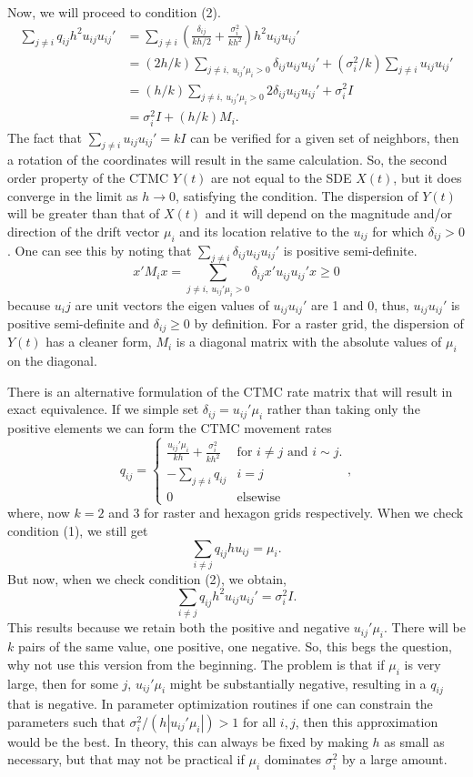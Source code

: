\documentclass[12pt]{article}
\begin{document}
Now, we will proceed to condition (2). $$
\begin{aligned}
\sum_{j\ne i} q_{ij} h^2 u_{ij}u_{ij}' &= \sum_{j\ne i} \left(\frac{\delta_{ij}}{kh/2} + \frac{\sigma^2_i}{kh^2}\right) h^2 u_{ij}u_{ij}' \\
&=  (2h/k)\sum_{j\ne i,\ u_{ij}'\mu_i >0} \delta_{ij}u_{ij}u_{ij}' + (\sigma^2_i/k) \sum_{j\ne i} u_{ij}u_{ij}'\\
&= (h/k)\sum_{j\ne i,\ u_{ij}'\mu_i >0} 2\delta_{ij}u_{ij}u_{ij}' + \sigma^2_i I \\
&=  \sigma^2_i I + (h/k)M_i.
\end{aligned}
$$ The fact that $\sum_{j\ne i} u_{ij}u_{ij}' = kI$ can be verified for a given set of neighbors, then a rotation of the coordinates will result in the same calculation. So, the second order property of the CTMC $Y(t)$ are not equal to the SDE $X(t)$, but it does converge in the limit as $h\to 0$, satisfying the condition. The dispersion of $Y(t)$ will be greater than that of $X(t)$ and it will depend on the magnitude and/or direction of the drift vector $\mu_i$ and its location relative to the $u_{ij}$ for which $\delta_{ij} >0$. One can see this by noting that $\sum_{j\ne i} \delta_{ij}u_{ij}u_{ij}'$ is positive semi-definite. $$
x'M_ix =  \sum_{j\ne i,\ u_{ij}'\mu_i >0} \delta_{ij} x'u_{ij}u_{ij}'x \ge 0
$$ because $u_ij$ are unit vectors the eigen values of $u_{ij}u_{ij}'$ are 1 and 0, thus, $u_{ij}u_{ij}'$ is positive semi-definite and $\delta_{ij} \ge 0$ by definition. For a raster grid, the dispersion of $Y(t)$ has a cleaner form, $M_i$ is a diagonal matrix with the absolute values of $\mu_i$ on the diagonal.

There is an alternative formulation of the CTMC rate matrix that will result in exact equivalence. If we simple set $\delta_{ij} = u_{ij}'\mu_i$ rather than taking only the positive elements we can form the CTMC movement rates $$
q_{ij} = \left\{
\begin{array}{ll}
\frac{u_{ij}'\mu_i}{kh} + \frac{\sigma^2_i}{kh^2} & \text{for } i\ne j \text{ and } i \sim j. \\
-\sum_{j\ne i} q_{ij} & i = j \\
0 & \text{elsewise}
\end{array}
\right.,
$$ where, now $k=2$ and 3 for raster and hexagon grids respectively. When we check condition (1), we still get $$
\sum_{i\ne j} q_{ij}hu_{ij} = \mu_i.
$$ But now, when we check condition (2), we obtain, $$
\sum_{i\ne j} q_{ij}h^2u_{ij}u_{ij}' = \sigma_i^2I.
$$ This results because we retain both the positive and negative $u_{ij}'\mu_i$. There will be $k$ pairs of the same value, one positive, one negative. So, this begs the question, why not use this version from the beginning. The problem is that if $\mu_i$ is very large, then for some $j$, $u_{ij}'\mu_i$ might be substantially negative, resulting in a $q_{ij}$ that is negative. In parameter optimization routines if one can constrain the parameters such that $\sigma^2_i/(h|u_{ij}'\mu_i|) > 1$ for all $i,j$, then this approximation would be the best. In theory, this can always be fixed by making $h$ as small as necessary, but that may not be practical if $\mu_i$ dominates $\sigma^2_i$ by a large amount.
\end{document}
